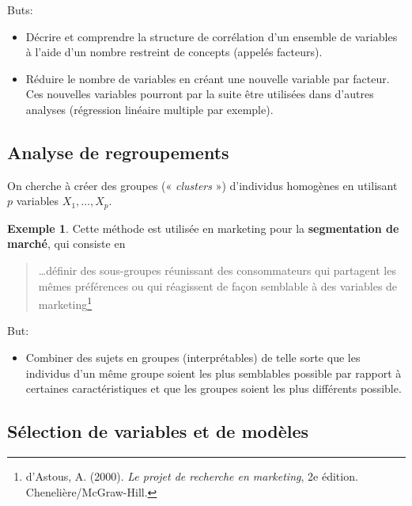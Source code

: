 \documentclass[
  11pt,
  letterpaper,
]{book}
\providecommand{\tightlist}{%
  \setlength{\itemsep}{0pt}\setlength{\parskip}{0pt}}
\theoremstyle{definition}
\theoremstyle{definition}
\newtheorem{example}{Exemple}[chapter]
\theoremstyle{definition}
\theoremstyle{remark}
\begin{document}
Buts:

\begin{itemize}
\tightlist
\item
  Décrire et comprendre la structure de corrélation d'un ensemble de variables à l'aide d'un nombre restreint de concepts (appelés facteurs).
\item
  Réduire le nombre de variables en créant une nouvelle variable par facteur. Ces nouvelles variables pourront par la suite être utilisées dans d'autres analyses (régression linéaire multiple par exemple).
\end{itemize}

\hypertarget{analyse-de-regroupements}{%
\subsection{Analyse de regroupements}\label{analyse-de-regroupements}}

On cherche à créer des groupes (« \emph{clusters} ») d'individus homogènes en utilisant \(p\) variables \(X_1, \ldots, X_p\).

\begin{example}
\protect\hypertarget{exm:unnamed-chunk-2}{}{\label{exm:unnamed-chunk-2} }
Cette méthode est utilisée en marketing pour la \textbf{segmentation de marché}, qui consiste en

\begin{quote}
\ldots définir des sous-groupes réunissant des consommateurs qui partagent les mêmes préférences ou qui réagissent de façon semblable à des variables de marketing\footnote{d'Astous, A. (2000). \emph{Le projet de recherche en marketing}, 2e édition. Chenelière/McGraw-Hill.}
\end{quote}
\end{example}

But:

\begin{itemize}
\tightlist
\item
  Combiner des sujets en groupes (interprétables) de telle sorte que les individus d'un même groupe soient les plus semblables possible par rapport à certaines caractéristiques et que les groupes soient les plus différents possible.
\end{itemize}

\hypertarget{suxe9lection-de-variables-et-de-moduxe8les}{%
\subsection{Sélection de variables et de modèles}\label{suxe9lection-de-variables-et-de-moduxe8les}}
\end{document}
